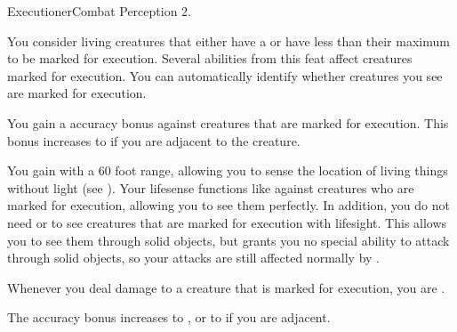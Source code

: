   \begin{feat}{Executioner}{Combat}
    \featpres Perception 2.

     You consider living creatures that either have a  or have less than their maximum  to be marked for execution.
    Several abilities from this feat affect creatures marked for execution.
    You can automatically identify whether creatures you see are marked for execution.

     You gain a  accuracy bonus against creatures that are marked for execution.
    This bonus increases to  if you are adjacent to the creature.

     You gain  with a 60 foot range, allowing you to sense the location of living things without light (see ).
    Your lifesense functions like  against creatures who are marked for execution, allowing you to see them perfectly.
    In addition, you do not need  or  to see creatures that are marked for execution with lifesight.
    This allows you to see them through solid objects, but grants you no special ability to attack through solid objects, so your attacks are still affected normally by .

     Whenever you deal damage to a creature that is marked for execution, you are  \empowered.

     The accuracy bonus increases to , or to  if you are adjacent.
  \end{feat}

